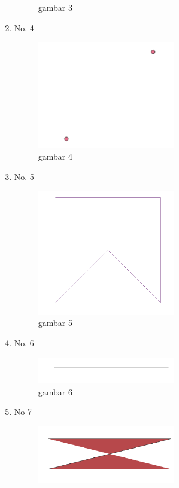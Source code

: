 \begin{enumerate}
\begin{figure}[H]
		\centering
		\caption{gambar 3}
	\end{figure}
	\item No. 4
	
	\begin{figure}[H]
		\includegraphics[width=6cm]{figures/Tugas2/1174091/4.png}
		\centering
		\caption{gambar 4}
	\end{figure}
	\item No. 5
	
	\begin{figure}[H]
		\includegraphics[width=6cm]{figures/Tugas2/1174091/5.png}
		\centering
		\caption{gambar 5}
	\end{figure}
	\item No. 6
	
	\begin{figure}[H]
		\includegraphics[width=6cm]{figures/Tugas2/1174091/6.png}
		\centering
		\caption{gambar 6}
	\end{figure}
	\item No 7
	
	\begin{figure}[H]
		\includegraphics[width=6cm]{figures/Tugas2/1174091/7.png}

\end{figure}
\end{enumerate}
